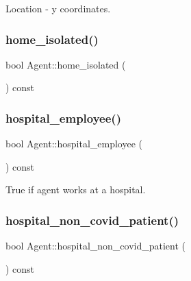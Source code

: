 Location -\/ y coordinates. 

\mbox{\label{classAgent_a8447e6cb0bfcc4f31ad528da5ce166b1}} 
\subsubsection{\texorpdfstring{home\+\_\+isolated()}{home\_isolated()}}
{\footnotesize\ttfamily bool Agent\+::home\+\_\+isolated (\begin{DoxyParamCaption}{ }\end{DoxyParamCaption}) const\hspace{0.3cm}{\ttfamily [inline]}}

\mbox{\label{classAgent_a6a56ebd7762964bcfe5033aa03c519b7}} 
\subsubsection{\texorpdfstring{hospital\+\_\+employee()}{hospital\_employee()}}
{\footnotesize\ttfamily bool Agent\+::hospital\+\_\+employee (\begin{DoxyParamCaption}{ }\end{DoxyParamCaption}) const\hspace{0.3cm}{\ttfamily [inline]}}



True if agent works at a hospital. 

\mbox{\label{classAgent_a6ed91d3d0a946999ab67241776ff928f}} 
\subsubsection{\texorpdfstring{hospital\+\_\+non\+\_\+covid\+\_\+patient()}{hospital\_non\_covid\_patient()}}
{\footnotesize\ttfamily bool Agent\+::hospital\+\_\+non\+\_\+covid\+\_\+patient (\begin{DoxyParamCaption}{ }\end{DoxyParamCaption}) const\hspace{0.3cm}{\ttfamily [inline]}}



